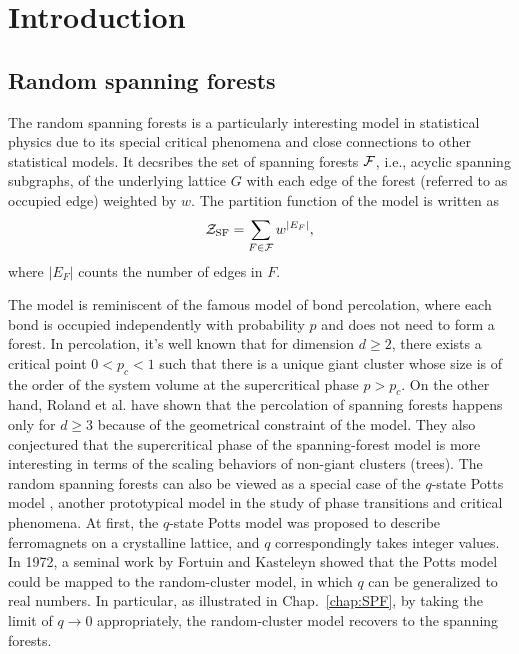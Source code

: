 \chapter{Introduction}\label{chap:intro}

\section{Random spanning forests}
The random spanning forests is a particularly interesting model in statistical physics due to its special critical phenomena
and close connections to other statistical models. It decsribes the set of spanning forests ${\mathcal F}$, i.e., acyclic spanning subgraphs, of the underlying
lattice $G$ with each edge of the forest (referred to as occupied edge) weighted by $w$. The partition function of the model is written as
\begin{equation}\label{eq:SPF_partition}
	{\mathcal Z}_{\text{SF}} = \sum_{F \in {\mathcal F}} w^{|E_F|},
\end{equation}
where $|E_F|$ counts the number of edges in $F$. 

The model is reminiscent of the famous model of bond percolation, where each bond is occupied independently with probability $p$ and does not need to form a forest.
In percolation, it's well known that for dimension $d \geq 2$, there exists a critical point $0 < p_c < 1$ such that there is a unique giant cluster whose size is of the order of the system volume
at the supercritical phase $p > p_c$. On the other hand, Roland et al. \cite{Roland2021Percolation} have shown that the percolation of spanning forests happens only for $d \geq 3$ 
because of the geometrical constraint of the model. They also conjectured that the supercritical phase of the spanning-forest model is more interesting in terms of the scaling behaviors of non-giant clusters (trees). 
The random spanning forests can also be viewed as a special case of the $q$-state Potts model \cite{Potts1952, Wu1982}, another prototypical model in the study of phase transitions and critical phenomena.
At first, the $q$-state Potts model was proposed to describe ferromagnets on a crystalline lattice, and $q$ correspondingly takes integer values.
In 1972, a seminal work by Fortuin and Kasteleyn \cite{Fortuin1972} showed that the Potts model could be mapped to the random-cluster model, in which $q$ can be 
generalized to real numbers. In particular, as illustrated in Chap.~\ref{chap:SPF}, by taking the limit of $q\to 0$ appropriately,
the random-cluster model recovers to the spanning forests.

